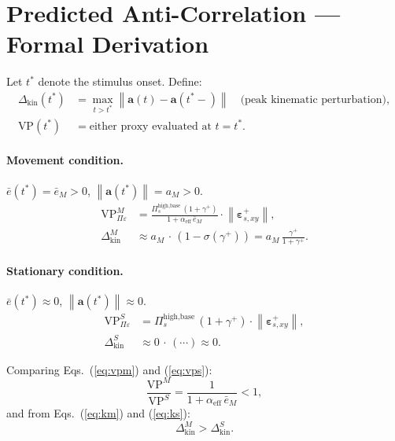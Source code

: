 \documentclass[11pt, a4paper]{article}
\newcommand{\vect}[1]{\bm{#1}}
\newcommand{\norm}[1]{\left\|#1\right\|}
\begin{document}
\section{Predicted Anti-Correlation — Formal Derivation}

Let $t^*$ denote the stimulus onset. Define:
\begin{align}
  \Delta_{\text{kin}}(t^*)
    &= \max_{t>t^*}\norm{\vect{a}(t) - \vect{a}(t^*-)}
       \quad\text{(peak kinematic perturbation)},\\
  \text{VP}(t^*)
    &= \text{either proxy evaluated at }t = t^*.
\end{align}

\paragraph{Movement condition.}
$\bar{e}(t^*) = \bar{e}_M > 0$, $\norm{\vect{a}(t^*)} = a_M > 0$.
\begin{align}
  \text{VP}_{\Pi\varepsilon}^M
    &= \frac{\Pi_s^{\text{high,base}}\,(1+\gamma^+)}{1+\alpha_{\text{eff}}\,\bar{e}_M}
       \cdot \norm{\vect{\varepsilon}_{s,xy}^+}, \label{eq:vpm}\\
  \Delta_{\text{kin}}^M
    &\approx a_M\,\cdot\,(1 - \sigma(\gamma^+))
     = a_M\,\frac{\gamma^+}{1+\gamma^+}. \label{eq:km}
\end{align}

\paragraph{Stationary condition.}
$\bar{e}(t^*) \approx 0$, $\norm{\vect{a}(t^*)} \approx 0$.
\begin{align}
  \text{VP}_{\Pi\varepsilon}^S
    &= \Pi_s^{\text{high,base}}\,(1+\gamma^+)\cdot\norm{\vect{\varepsilon}_{s,xy}^+},
    \label{eq:vps}\\
  \Delta_{\text{kin}}^S
    &\approx 0\,\cdot\,(\cdots) \approx 0. \label{eq:ks}
\end{align}

Comparing Eqs.~(\ref{eq:vpm}) and (\ref{eq:vps}):
\begin{equation}
  \frac{\text{VP}^M}{\text{VP}^S}
  = \frac{1}{1 + \alpha_{\text{eff}}\,\bar{e}_M} < 1,
\end{equation}
and from Eqs.~(\ref{eq:km}) and (\ref{eq:ks}):
\begin{equation}
  \Delta_{\text{kin}}^M > \Delta_{\text{kin}}^S.
\end{equation}
\end{document}
